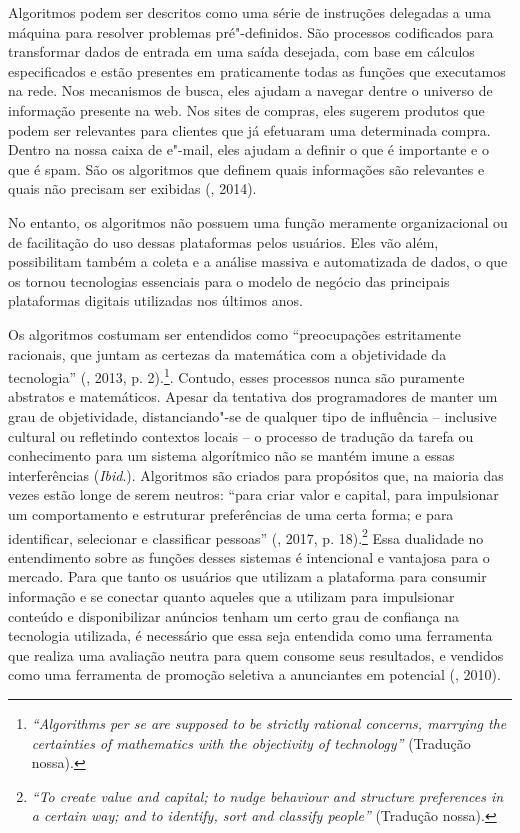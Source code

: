 Algoritmos podem ser descritos como uma série de instruções delegadas a
uma máquina para resolver problemas pré"-definidos. São processos
codificados para transformar dados de entrada em uma saída desejada, com
base em cálculos especificados e estão presentes em praticamente todas
as funções que executamos na rede. Nos mecanismos de busca, eles ajudam
a navegar dentre o universo de informação presente na web. Nos sites de
compras, eles sugerem produtos que podem ser relevantes para clientes
que já efetuaram uma determinada compra. Dentro na nossa caixa de
e"-mail, eles ajudam a definir o que é importante e o que é spam. São os
algoritmos que definem quais informações são relevantes e quais não
precisam ser exibidas (, 2014).

No entanto, os algoritmos não possuem uma função meramente
organizacional ou de facilitação do uso dessas plataformas pelos
usuários. Eles vão além, possibilitam também a coleta e a análise
massiva e automatizada de dados, o que os tornou tecnologias essenciais
para o modelo de negócio das principais plataformas digitais utilizadas
nos últimos anos.

Os algoritmos costumam ser entendidos como ``preocupações estritamente
racionais, que juntam as certezas da matemática com a objetividade da
tecnologia'' (, 2013, p. 2).\footnote{\emph{``Algorithms per se are supposed to be strictly
  rational concerns, marrying the certainties of mathematics with the
  objectivity of technology''} (Tradução nossa).}.
Contudo, esses processos nunca são puramente abstratos e matemáticos.
Apesar da tentativa dos programadores de manter um grau de objetividade,
distanciando"-se de qualquer tipo de influência -- inclusive cultural ou
refletindo contextos locais -- o processo de tradução da tarefa ou
conhecimento para um sistema algorítmico não se mantém imune a essas
interferências (\emph{Ibid}.). Algoritmos são criados para propósitos que, na
maioria das vezes estão longe de serem neutros: ``para criar valor e
capital, para impulsionar um comportamento e estruturar preferências de
uma certa forma; e para identificar, selecionar e classificar
pessoas'' (, 2017, p. 18).\footnote{\emph{``To create value and capital; to nudge behaviour and structure preferences in a certain way; and to identify, sort and classify people''} (Tradução nossa).} Essa dualidade no
entendimento sobre as funções desses sistemas é intencional e vantajosa
para o mercado. Para que tanto os usuários que utilizam a plataforma
para consumir informação e se conectar quanto aqueles que a utilizam
para impulsionar conteúdo e disponibilizar anúncios tenham um certo grau
de confiança na tecnologia utilizada, é necessário que essa seja
entendida como uma ferramenta que realiza uma avaliação neutra para quem
consome seus resultados, e vendidos como uma ferramenta de promoção
seletiva a anunciantes em potencial (, 2010).


